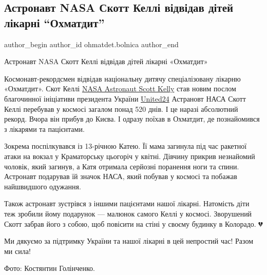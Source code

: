  
 
 
 
 
 
\subsection{Астронавт NASA Скотт Келлі відвідав дітей лікарні \enquote{Охматдит}}
\label{sec:28_11_2022.fb.ohmatdet.bolnica.1.astronavt}
 
\ifcmt
 author_begin
   author_id ohmatdet.bolnica
 author_end
\fi

Астронавт NASA Скотт Келлі відвідав дітей лікарні «Охматдит»💫

Космонавт-рекордсмен відвідав національну дитячу спеціалізовану лікарню
«Охматдит». Скот Келлі \href{https://www.facebook.com/StationCDRKelly}{NASA
Astronaut Scott Kelly} став новим послом благочинної ініціативи президента
України \href{https://www.facebook.com/u24.gov.ua}{United24} Астрановт НАСА
Скотт Келлі перебував у космосі загалом понад 520 днів. І це наразі абсолютний
рекорд. Вчора він прибув до Києва. І одразу поїхав в Охматдит, де познайомився
з лікарями та пацієнтами.


Зокрема поспілкувався із 13-річною Катею. Її мама загинула під час ракетної
атаки на вокзал у Краматорську цьогоріч у квітні. Дівчину прикрив незнайомий
чоловік, який загинув, а Катя отримала серйозні поранення ноги та спини.
Астронавт подарував їй значок НАСА, який побував у космосі та побажав
найшвидшого одужання. 


Також астронавт зустрівся з іншими пацієнтами нашої лікарні. Натомість діти теж
зробили йому подарунок — малюнок самого Келлі у космосі. Зворушений Скотт
забрав його з собою, щоб повісити на стіні у своєму будинку в Колорадо. 💔

Ми дякуємо за підтримку України та нашої лікарні в цей непростий час! Разом ми
сила!🚀

Фото: Костянтин Голінченко.
